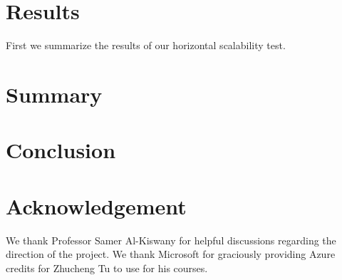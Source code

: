 \documentclass[letterpaper,twocolumn,10pt]{article}
\theoremstyle{definition}
\begin{document}
\section{Results}

First we summarize the results of our horizontal scalability test.

\section{Summary}


\section{Conclusion}

\section*{Acknowledgement}
We thank Professor Samer Al-Kiswany for helpful discussions regarding the direction 
of the project. We thank Microsoft for graciously providing Azure credits for 
Zhucheng Tu to use for his courses.
{\footnotesize 
}
\end{document}
